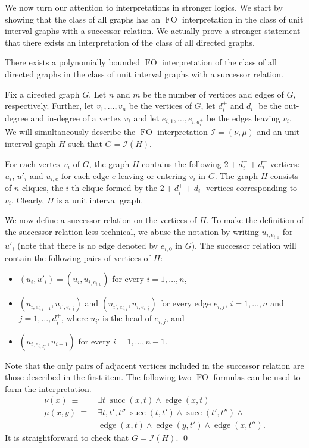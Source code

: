 \documentclass{CSML}
\def\prebox#1{\mathop{\mbox{#1}}}
\newcommand{\FO}{\ensuremath{\operatorname{FO}}\xspace}
\newcommand{\cI}{\mathcal{I}}
\theoremstyle{plain}\newtheorem{claim}[thm]{Claim}
\begin{document}
We now turn our attention to interpretations in stronger logics.
We start by showing that the class of all graphs
has an \FO interpretation in the class of unit interval graphs with a successor relation.
We actually prove a stronger statement that there exists an interpretation of the class of all directed graphs.

\begin{lem}
\label{lm-succ-lower}
There exists a polynomially bounded \FO interpretation of the class of all directed graphs
in the class of unit interval graphs with a successor relation.
\end{lem}

\proof
Fix a directed graph $G$.
Let $n$ and $m$ be the number of vertices and edges of $G$, respectively.
Further, let $v_1,\ldots,v_n$ be the vertices of $G$,
let $d^+_i$ and $d^-_i$ be the out-degree and in-degree of a vertex $v_i$ and
let $e_{i,1},\ldots,e_{i,d^+_i}$ be the edges leaving $v_i$.
We will simultaneously describe the \FO interpretation $\cI=(\nu,\mu)$ and an unit interval graph $H$ such that $G=\cI(H)$.

For each vertex $v_i$ of $G$,
the graph $H$ contains the following $2+d^+_i+d^-_i$ vertices:
$u_i$, $u'_i$ and $u_{i,e}$ for each edge $e$ leaving or entering $v_i$ in $G$.
The graph $H$ consists of $n$ cliques, the $i$-th clique formed by the $2+d^+_i+d^-_i$ vertices corresponding to $v_i$.
Clearly, $H$ is a unit interval graph.

We now define a successor relation on the vertices of $H$.
To make the definition of the successor relation less technical,
we abuse the notation by writing $u_{i,e_{i,0}}$ for $u'_i$ (note that there is no edge denoted by $e_{i,0}$ in $G$).
The successor relation will contain the following pairs of vertices of $H$:
\begin{itemize}
\item $(u_i,u'_i)=(u_i,u_{i,e_{i,0}})$ for every $i=1,\ldots,n$,
\item $(u_{i,e_{i,j-1}},u_{i',e_{i,j}})$ and $(u_{i',e_{i,j}},u_{i,e_{i,j}})$ for every edge $e_{i,j}$, $i=1,\ldots,n$ and $j=1,\ldots,d^+_i$,
      where $u_{i'}$ is the head of $e_{i,j}$, and
\item $(u_{i,e_{i,d^+_i}},u_{i+1})$ for every $i=1,\ldots,n-1$.
\end{itemize}
Note that the only pairs of adjacent vertices included in the successor relation are those described in the first item.
The following two \FO formulas can be used to form the interpretation.
\begin{align*}
\nu(x)   \> \equiv \> & \exists t \; \prebox{succ}(x,t)\wedge \prebox{edge}(x,t) \\
\mu(x,y) \> \equiv \> & \exists t,t',t'' \; \prebox{succ}(t,t')\wedge \prebox{succ}(t',t'') \wedge \\
                      & \prebox{edge}(x,t) \wedge \prebox{edge}(y,t') \wedge \prebox{edge}(x,t'').
\end{align*}
It is straightforward to check that $G=\cI(H)$.
\qed
\end{document}
